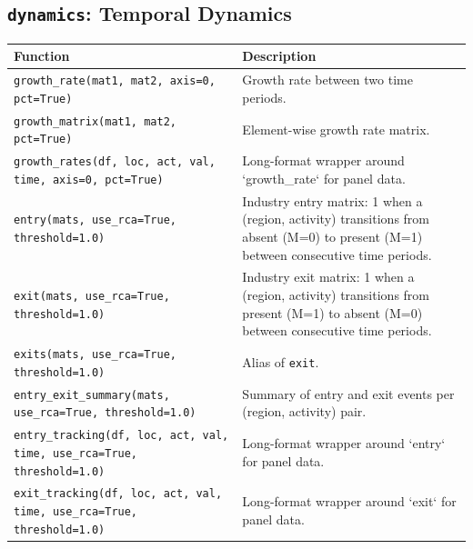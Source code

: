 \subsection{\texttt{dynamics}: Temporal Dynamics}
\begin{longtable}{>{\raggedright\arraybackslash}p{9.2cm} >{\raggedright\arraybackslash}p{7.0cm}}
\toprule
\textbf{Function} & \textbf{Description} \\
\midrule\endhead
\texttt{\footnotesize growth\_rate(mat1, mat2, axis=0, pct=True)} & {\small Growth rate between two time periods.} \\[2pt]
\texttt{\footnotesize growth\_matrix(mat1, mat2, pct=True)} & {\small Element-wise growth rate matrix.} \\[2pt]
\texttt{\footnotesize growth\_rates(df, loc, act, val, time, axis=0, pct=True)} & {\small Long-format wrapper around `growth\_rate` for panel data.} \\[2pt]
\texttt{\footnotesize entry(mats, use\_rca=True, threshold=1.0)} & {\small Industry entry matrix: 1 when a (region, activity) transitions from absent (M=0) to present (M=1) between consecutive time periods.} \\[2pt]
\texttt{\footnotesize exit(mats, use\_rca=True, threshold=1.0)} & {\small Industry exit matrix: 1 when a (region, activity) transitions from present (M=1) to absent (M=0) between consecutive time periods.} \\[2pt]
\texttt{\footnotesize exits(mats, use\_rca=True, threshold=1.0)} & {\small Alias of \texttt{exit}.} \\[2pt]
\texttt{\footnotesize entry\_exit\_summary(mats, use\_rca=True, threshold=1.0)} & {\small Summary of entry and exit events per (region, activity) pair.} \\[2pt]
\texttt{\footnotesize entry\_tracking(df, loc, act, val, time, use\_rca=True, threshold=1.0)} & {\small Long-format wrapper around `entry` for panel data.} \\[2pt]
\texttt{\footnotesize exit\_tracking(df, loc, act, val, time, use\_rca=True, threshold=1.0)} & {\small Long-format wrapper around `exit` for panel data.} \\[2pt]
\bottomrule
\end{longtable}

